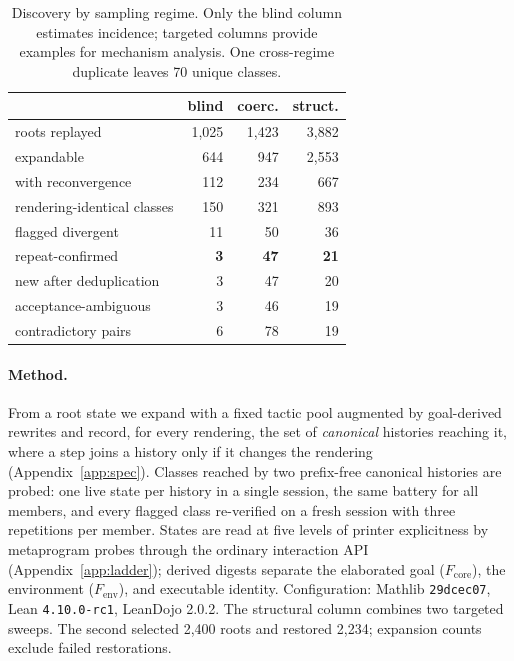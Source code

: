 \documentclass[11pt]{article}
\begin{document}
\begin{table}[t]\centering\small
\setlength{\tabcolsep}{3.2pt}
\begin{tabular}{@{}lrrr@{}}
\toprule
 & blind & coerc. & struct. \\
\midrule
roots replayed             & 1{,}025 & 1{,}423 & 3{,}882 \\
expandable                 & 644     & 947     & 2{,}553 \\
with reconvergence         & 112     & 234     & 667 \\
rendering-identical classes& 150     & 321     & 893 \\
flagged divergent          & 11      & 50      & 36 \\
repeat-confirmed           & \textbf{3} & \textbf{47} & \textbf{21} \\
new after deduplication    & 3       & 47      & 20 \\
acceptance-ambiguous       & 3       & 46      & 19 \\
contradictory pairs        & 6       & 78      & 19 \\
\bottomrule
\end{tabular}
\caption{Discovery by sampling regime. Only the blind column estimates
incidence; targeted columns provide examples for mechanism analysis. One
cross-regime duplicate leaves 70 unique classes.}
\label{tab:regime}
\end{table}

\paragraph{Method.}
From a root state we expand with a fixed tactic pool augmented by goal-derived
rewrites and record, for every rendering, the set of \emph{canonical} histories
reaching it, where a step joins a history only if it changes the rendering
(Appendix~\ref{app:spec}). Classes reached by two prefix-free canonical
histories are probed: one live state per history in a single session, the same
battery for all members, and every flagged class re-verified on a fresh session
with three repetitions per member. States are read at five levels of printer
explicitness by metaprogram probes through the ordinary interaction API
(Appendix~\ref{app:ladder}); derived digests separate the elaborated goal
($F_{\text{core}}$), the environment ($F_{\text{env}}$), and executable
identity. Configuration: Mathlib \texttt{29dcec07}, Lean \texttt{4.10.0-rc1},
LeanDojo 2.0.2. The structural column combines two targeted sweeps. The second
selected 2{,}400 roots and restored 2{,}234; expansion counts exclude failed
restorations.
\end{document}
